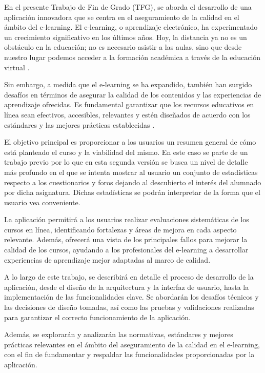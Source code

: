 
En el presente Trabajo de Fin de Grado (TFG), se aborda el desarrollo de una aplicación innovadora que se centra en el aseguramiento de la calidad en el ámbito del e-learning. El e-learning, o aprendizaje electrónico, ha experimentado un crecimiento significativo en los últimos años. Hoy, la distancia ya no es un obstáculo en la educación; no es necesario asistir a las aulas, sino que desde nuestro lugar podemos acceder a la formación académica a través de la educación virtual \cite{educacionvirtual2023}.

Sin embargo, a medida que el e-learning se ha expandido, también han surgido desafíos en términos de asegurar la calidad de los contenidos y las experiencias de aprendizaje ofrecidas. Es fundamental garantizar que los recursos educativos en línea sean efectivos, accesibles, relevantes y estén diseñados de acuerdo con los estándares y las mejores prácticas establecidas \cite{buenaspracticas2017}.

El objetivo principal es proporcionar a los usuarios un resumen general de cómo está planteado el curso y la viabilidad del mismo. En este caso se parte de un trabajo previo \cite{previotfg} por lo que  en esta segunda versión se busca un nivel de detalle más profundo en el que se intenta mostrar al usuario un conjunto de estadísticas respecto a los cuestionarios y foros dejando al descubierto el interés del alumnado por dicha asignatura. Dichas estadísticas se podrán interpretar de la forma que el usuario vea conveniente. 

La aplicación permitirá a los usuarios realizar evaluaciones sistemáticas de los cursos en línea, identificando fortalezas y áreas de mejora en cada aspecto relevante. Además, ofrecerá una vista de los principales fallos para mejorar la calidad de los cursos, ayudando a los profesionales del e-learning a desarrollar experiencias de aprendizaje mejor adaptadas al marco de calidad.

A lo largo de este trabajo, se describirá en detalle el proceso de desarrollo de la aplicación, desde el diseño de la arquitectura y la interfaz de usuario, hasta la implementación de las funcionalidades clave. Se abordarán los desafíos técnicos y las decisiones de diseño tomadas, así como las pruebas y validaciones realizadas para garantizar el correcto funcionamiento de la aplicación.

Además, se explorarán y analizarán las normativas, estándares y mejores prácticas relevantes en el ámbito del aseguramiento de la calidad en el e-learning, con el fin de fundamentar y respaldar las funcionalidades proporcionadas por la aplicación.